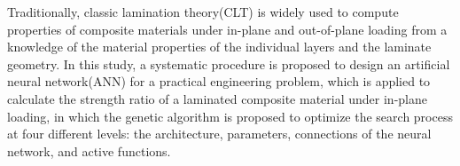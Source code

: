 Traditionally, classic lamination theory(CLT) is widely used to compute
properties of composite materials under in-plane and out-of-plane loading from
a knowledge of the material properties of the individual layers and the
laminate geometry. In this study, a systematic procedure is proposed to design
an artificial neural network(ANN) for a practical engineering problem, which is
applied to calculate the strength ratio of a laminated composite material under
in-plane loading, in which the genetic algorithm is proposed to optimize the search
process at four different levels: the architecture, parameters, connections of
the neural network, and active functions. 
